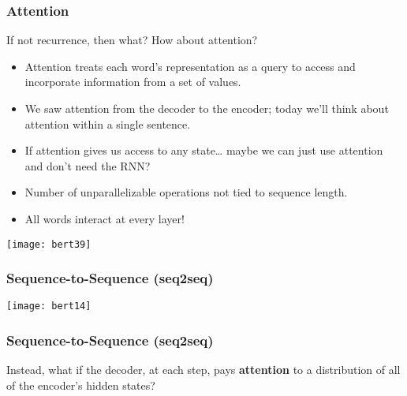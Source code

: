 \begin{frame}[fragile]\frametitle{Attention}

If not recurrence, then what? How about attention?

\begin{itemize}
\item Attention treats each word’s representation as a query to access and  incorporate information from a set of values.
\item We saw attention from the decoder to the encoder; today we’ll think about
attention within a single sentence.
\item If attention gives us access to any state… maybe we can just use attention and don’t need the RNN?
\item Number of unparallelizable operations not tied to sequence length.
\item All words interact at every layer!

\end{itemize}	 

\begin{center}
\texttt{[image: bert39]}
\end{center}	

 
\end{frame}





\begin{frame}[fragile]\frametitle{Sequence-to-Sequence (seq2seq)}

\begin{center}
\texttt{[image: bert14]}
\end{center}	

\end{frame}

\begin{frame}[fragile]\frametitle{Sequence-to-Sequence (seq2seq)}

\begin{center}
Instead, what if the decoder, at each step, pays {\bf attention} to a distribution of all of the encoder’s hidden states?
\end{center}	

\end{frame}

